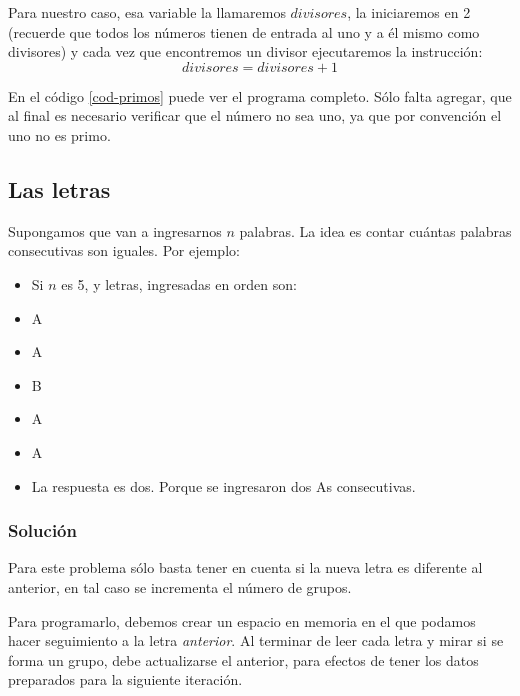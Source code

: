 Para nuestro caso, esa variable la llamaremos $divisores$, la iniciaremos en 2 (recuerde que todos los números tienen de entrada al uno y a él mismo como divisores) y cada vez que encontremos un divisor ejecutaremos la instrucción:
\begin{equation}
divisores = divisores + 1
\end{equation}

En el código \ref{cod-primos} puede ver el programa completo. Sólo falta agregar, que al final es necesario verificar que el número no sea uno, ya que por convención el uno no es primo. \\

\newpage

 



\subsection{Las letras}


Supongamos que van a ingresarnos $n$ palabras. La idea es contar cuántas palabras consecutivas son iguales. Por ejemplo:

\begin{itemize}
	\item Si $n$ es 5, y letras, ingresadas en orden son:
	\item A
	\item A
	\item B
	\item A
	\item A
	\item La respuesta es dos. Porque se ingresaron dos As consecutivas.
\end{itemize}



\subsubsection{Solución}

Para este problema sólo basta tener en cuenta si la nueva letra es diferente al anterior, en tal caso se incrementa el número de grupos.

Para programarlo, debemos crear un espacio en memoria en el que podamos hacer seguimiento a la letra \emph{anterior}. Al terminar de leer cada letra y mirar si se forma un grupo, debe actualizarse el anterior, para efectos de tener los datos preparados para la siguiente iteración.

